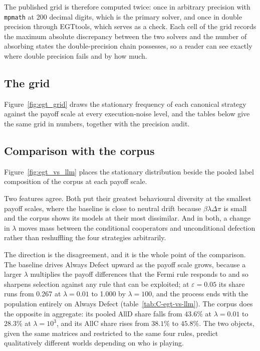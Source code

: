 \documentclass[openacc]{rsproca_new}
\newcommand{\lam}{\lambda}
\begin{document}
The published grid is therefore computed twice: once in arbitrary precision
with \texttt{mpmath} at 200 decimal digits, which is the primary solver, and
once in double precision through EGTtools, which serves as a check. Each cell
of the grid records the maximum absolute discrepancy between the two solvers
and the number of absorbing states the double-precision chain possesses, so a
reader can see exactly where double precision fails and by how much.

\subsection{The grid}\label{appendix:egt_grid}

Figure~\ref{fig:egt_grid} draws the stationary frequency of each canonical
strategy against the payoff scale at every execution-noise level, and the
tables below give the same grid in numbers, together with the precision audit.



\subsection{Comparison with the corpus}\label{appendix:egt_vs_llm}

Figure~\ref{fig:egt_vs_llm} places the stationary distribution beside the
pooled label composition of the corpus at each payoff scale.

Two features agree. Both put their greatest behavioural diversity at the
smallest payoff scales, where the baseline is close to neutral drift because
$\beta \lam \Delta\pi$ is small and the corpus shows its models at their most
dissimilar. And in both, a change in $\lam$ moves mass between the conditional
cooperators and unconditional defection rather than reshuffling the four
strategies arbitrarily.

The direction is the disagreement, and it is the whole point of the comparison.
The baseline drives Always Defect upward as the payoff scale grows, because a
larger $\lam$ multiplies the payoff differences that the Fermi rule responds to
and so sharpens selection against any rule that can be exploited; at
$\varepsilon = 0.05$ its share runs from 0.267 at $\lam = 0.01$ to 1.000 by
$\lam = 100$, and the process ends with the population entirely on Always
Defect (table~\ref{tab:C-egt-vs-llm}). The corpus does the opposite in
aggregate: its pooled AllD share falls from $43.6\%$ at $\lam = 0.01$ to
$28.3\%$ at $\lam = 10^{3}$, and its AllC share rises from $38.1\%$ to
$45.8\%$. The two objects, given the same matrices and restricted to the same
four rules, predict qualitatively different worlds depending on who is playing.
\end{document}
